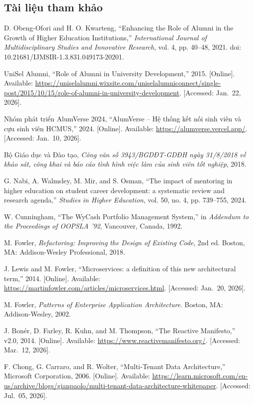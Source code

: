 \documentclass[12pt,a4paper]{article}
\begin{document}
\subsection{Tài liệu tham khảo}
\begin{enumerate}[label={[\arabic*]}]
\item \label{ref:obeng} D. Obeng-Ofori and H. O. Kwarteng, ``Enhancing the Role of Alumni in the Growth of Higher Education Institutions,'' \textit{International Journal of Multidisciplinary Studies and Innovative Research}, vol. 4, pp. 40--48, 2021. doi: 10.21681/IJMSIR-1.3.831.049173-20201.
\item \label{ref:unisel} UniSel Alumni, ``Role of Alumni in University Development,'' 2015. [Online]. Available: \url{https://uniselalumni.wixsite.com/uniselalumniconnect/single-post/2015/10/15/role-of-alumni-in-university-development}. [Accessed: Jan.~22, 2026].
\item \label{ref:alumverse} Nhóm phát triển AlumVerse 2024, ``AlumVerse -- Hệ thống kết nối sinh viên và cựu sinh viên HCMUS,'' 2024. [Online]. Available: \url{https://alumverse.vercel.app/}. [Accessed: Jan.~10, 2026].
\item \label{ref:moet} Bộ Giáo dục và Đào tạo, \textit{Công văn số 3943/BGDĐT-GDĐH ngày 31/8/2018 về khảo sát, công khai và báo cáo tình hình việc làm của sinh viên tốt nghiệp}, 2018.
\item \label{ref:nabi} G. Nabi, A. Walmsley, M. Mir, and S. Osman, ``The impact of mentoring in higher education on student career development: a systematic review and research agenda,'' \textit{Studies in Higher Education}, vol. 50, no. 4, pp. 739--755, 2024.
\item \label{ref:cunningham} W. Cunningham, ``The WyCash Portfolio Management System,'' in \textit{Addendum to the Proceedings of OOPSLA '92}, Vancouver, Canada, 1992.
\item \label{ref:fowler} M. Fowler, \textit{Refactoring: Improving the Design of Existing Code}, 2nd ed. Boston, MA: Addison-Wesley Professional, 2018.
\item \label{ref:microservices} J. Lewis and M. Fowler, ``Microservices: a definition of this new architectural term,'' 2014. [Online]. Available: \url{https://martinfowler.com/articles/microservices.html}. [Accessed: Jan.~20, 2026].
\item \label{ref:poeaa} M. Fowler, \textit{Patterns of Enterprise Application Architecture}. Boston, MA: Addison-Wesley, 2002.
\item \label{ref:reactive} J. Bonér, D. Farley, R. Kuhn, and M. Thompson, ``The Reactive Manifesto,'' v2.0, 2014. [Online]. Available: \url{https://www.reactivemanifesto.org/}. [Accessed: Mar.~12, 2026].
\item \label{ref:multitenant} F. Chong, G. Carraro, and R. Wolter, ``Multi-Tenant Data Architecture,'' Microsoft Corporation, 2006. [Online]. Available: \url{https://learn.microsoft.com/en-us/archive/blogs/gianpaolo/multi-tenant-data-architecture-whitepaper}. [Accessed: Jul.~05, 2026].
\end{enumerate}
\pagebreak
\end{document}
